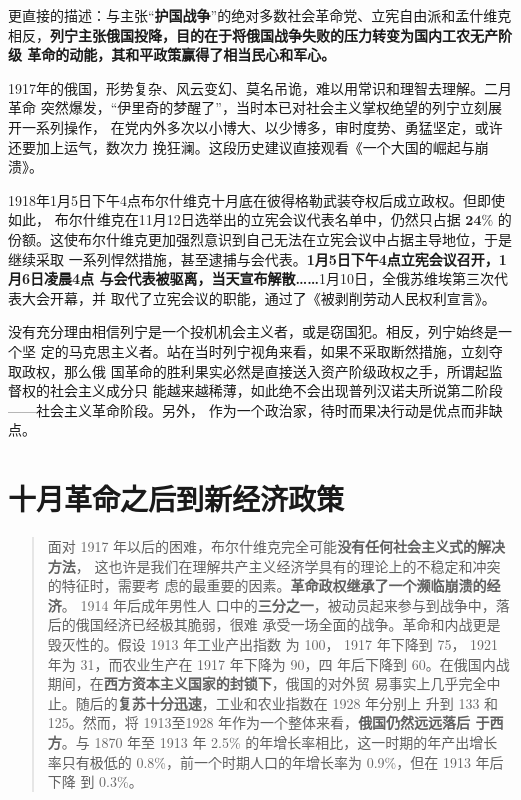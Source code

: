 更直接的描述：与主张“\textbf{护国战争}”的绝对多数社会革命党、立宪自由派和孟什维克
相反，\textbf{列宁主张俄国投降，目的在于将俄国战争失败的压力转变为国内工农无产阶级
  革命的动能，其和平政策赢得了相当民心和军心。}

1917年的俄国，形势复杂、风云变幻、莫名吊诡，难以用常识和理智去理解。二月革命
突然爆发，“伊里奇的梦醒了”，当时本已对社会主义掌权绝望的列宁立刻展开一系列操作，
在党内外多次以小博大、以少博多，审时度势、勇猛坚定，或许还要加上运气，数次力
挽狂澜。这段历史建议直接观看《一个大国的崛起与崩溃》。

1918年1月5日下午4点布尔什维克十月底在彼得格勒武装夺权后成立政权。但即使如此，
布尔什维克在11月12日选举出的立宪会议代表名单中，仍然只占据 $\mathbf{24\%}$ 的
份额。这使布尔什维克更加强烈意识到自己无法在立宪会议中占据主导地位，于是继续采取
一系列悍然措施，甚至逮捕与会代表。\textbf{1月5日下午4点立宪会议召开，1月6日凌晨4点
  与会代表被驱离，当天宣布解散……}1月10日，全俄苏维埃第三次代表大会开幕，并
取代了立宪会议的职能，通过了《被剥削劳动人民权利宣言》。

没有充分理由相信列宁是一个投机机会主义者，或是窃国犯。相反，列宁始终是一个坚
定的马克思主义者。站在当时列宁视角来看，如果不采取断然措施，立刻夺取政权，那么俄
国革命的胜利果实必然是直接送入资产阶级政权之手，所谓起监督权的社会主义成分只
能越来越稀薄，如此绝不会出现普列汉诺夫所说第二阶段——社会主义革命阶段。另外，
作为一个政治家，待时而果决行动是优点而非缺点。

\section{十月革命之后到新经济政策}

\begin{quotation}
  面对 1917 年以后的困难，布尔什维克完全可能\textbf{没有任何社会主义式的解决方法}，
  这也许是我们在理解共产主义经济学具有的理论上的不稳定和冲突的特征时，需要考
  虑的最重要的因素。\textbf{革命政权继承了一个濒临崩溃的经济}。 1914 年后成年男性人
  口中的\textbf{三分之一}，被动员起来参与到战争中，落后的俄国经济已经极其脆弱，很难
  承受一场全面的战争。革命和内战更是毁灭性的。假设 1913 年工业产出指数
  为 100， 1917 年下降到 75， 1921 年为 31，而农业生产在 1917 年下降为 90，四
  年后下降到 60。在俄国内战期间，在\textbf{西方资本主义国家的封锁下}，俄国的对外贸
  易事实上几乎完全中止。随后的\textbf{复苏十分迅速}，工业和农业指数在 1928 年分别上
  升到 133 和 125。然而，将 1913至1928 年作为一个整体来看，\textbf{俄国仍然远远落后
    于西方}。与 1870 年至 1913 年 2.5\% 的年增长率相比，这一时期的年产出增长
  率只有极低的 0.8\%，前一个时期人口的年增长率为 0.9\%，但在 1913 年后下降
  到 0.3\%。\cite[286-287]{mazhengshi}

\end{quotation}

